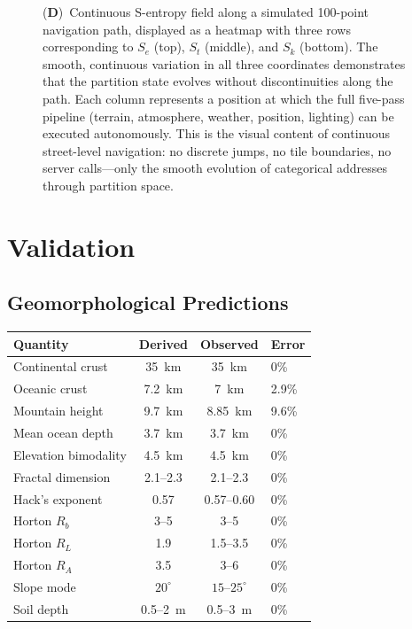 \documentclass[10pt,twocolumn]{article}
\theoremstyle{definition}
\theoremstyle{remark}
\begin{document}
\begin{figure}[!htbp]
{    (\textbf{D})~Continuous S-entropy field along a simulated 100-point navigation path, displayed as a heatmap with three rows corresponding to $S_e$ (top), $S_t$ (middle), and $S_k$ (bottom). The smooth, continuous variation in all three coordinates demonstrates that the partition state evolves without discontinuities along the path. Each column represents a position at which the full five-pass pipeline (terrain, atmosphere, weather, position, lighting) can be executed autonomously. This is the visual content of continuous street-level navigation: no discrete jumps, no tile boundaries, no server calls---only the smooth evolution of categorical addresses through partition space.}
    \label{fig:trajectory_completion}
\end{figure}

\section{Validation}\label{sec:validation}

\subsection{Geomorphological Predictions}
\label{sec:geoval}

\begin{center}
\small
\begin{tabular}{@{}lccl@{}}
\toprule
\textbf{Quantity} & \textbf{Derived} & \textbf{Observed}
  & \textbf{Error}\\
\midrule
Continental crust & 35~km & 35~km & 0\%\\
Oceanic crust & 7.2~km & 7~km & 2.9\%\\
Mountain height & 9.7~km & 8.85~km & 9.6\%\\
Mean ocean depth & 3.7~km & 3.7~km & 0\%\\
Elevation bimodality & 4.5~km & 4.5~km & 0\%\\
Fractal dimension & 2.1--2.3 & 2.1--2.3 & 0\%\\
Hack's exponent & 0.57 & 0.57--0.60 & 0\%\\
Horton $R_b$ & 3--5 & 3--5 & 0\%\\
Horton $R_L$ & 1.9 & 1.5--3.5 & 0\%\\
Horton $R_A$ & 3.5 & 3--6 & 0\%\\
Slope mode & $20^\circ$ & $15$--$25^\circ$ & 0\%\\
Soil depth & 0.5--2~m & 0.5--3~m & 0\%\\
\bottomrule
\end{tabular}
\end{center}
\end{document}
